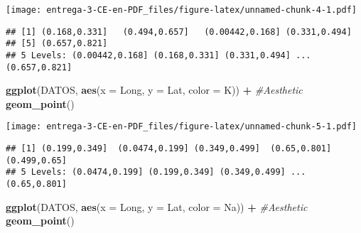 \documentclass[
]{article}
\newenvironment{Shaded}{\begin{snugshade}}{\end{snugshade}}
\newcommand{\CommentTok}[1]{\textcolor[rgb]{0.56,0.35,0.01}{\textit{#1}}}
\newcommand{\DataTypeTok}[1]{\textcolor[rgb]{0.13,0.29,0.53}{#1}}
\newcommand{\DecValTok}[1]{\textcolor[rgb]{0.00,0.00,0.81}{#1}}
\newcommand{\KeywordTok}[1]{\textcolor[rgb]{0.13,0.29,0.53}{\textbf{#1}}}
\newcommand{\NormalTok}[1]{#1}
\newcommand{\OperatorTok}[1]{\textcolor[rgb]{0.81,0.36,0.00}{\textbf{#1}}}
\newcommand{\StringTok}[1]{\textcolor[rgb]{0.31,0.60,0.02}{#1}}
\begin{document}
\texttt{[image: entrega-3-CE-en-PDF\_files/figure-latex/unnamed-chunk-4-1.pdf]}

\begin{Shaded}
\end{Shaded}

\begin{verbatim}
## [1] (0.168,0.331]   (0.494,0.657]   (0.00442,0.168] (0.331,0.494]  
## [5] (0.657,0.821]  
## 5 Levels: (0.00442,0.168] (0.168,0.331] (0.331,0.494] ... (0.657,0.821]
\end{verbatim}

\begin{Shaded}
\begin{Highlighting}[]
\KeywordTok{ggplot}\NormalTok{(DATOS, }\KeywordTok{aes}\NormalTok{(}\DataTypeTok{x =}\NormalTok{ Long, }\DataTypeTok{y =}\NormalTok{ Lat, }\DataTypeTok{color =}\NormalTok{ K)) }\OperatorTok{+}\StringTok{ }\CommentTok{#Aesthetic}
\StringTok{  }\KeywordTok{geom_point}\NormalTok{()}
\end{Highlighting}
\end{Shaded}

\texttt{[image: entrega-3-CE-en-PDF\_files/figure-latex/unnamed-chunk-5-1.pdf]}

\begin{Shaded}
\end{Shaded}

\begin{verbatim}
## [1] (0.199,0.349]  (0.0474,0.199] (0.349,0.499]  (0.65,0.801]   (0.499,0.65]  
## 5 Levels: (0.0474,0.199] (0.199,0.349] (0.349,0.499] ... (0.65,0.801]
\end{verbatim}

\begin{Shaded}
\begin{Highlighting}[]
\KeywordTok{ggplot}\NormalTok{(DATOS, }\KeywordTok{aes}\NormalTok{(}\DataTypeTok{x =}\NormalTok{ Long, }\DataTypeTok{y =}\NormalTok{ Lat, }\DataTypeTok{color =}\NormalTok{ Na)) }\OperatorTok{+}\StringTok{ }\CommentTok{#Aesthetic}
\StringTok{  }\KeywordTok{geom_point}\NormalTok{()}
\end{Highlighting}
\end{Shaded}
\end{document}
